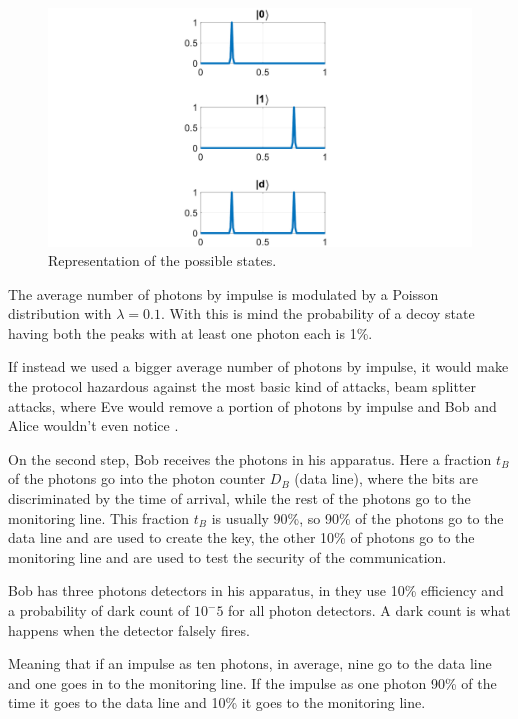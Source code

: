 \begin{refsection}
\begin{figure}[hbt!]
\centering
\includegraphics[width=1\linewidth]{./sdf/tq_76558_cow_protocol/slides/figures/S1A.pdf}
\caption{Representation of the possible states.}
\label{fig:sta}
\end{figure}

The average number of photons by impulse is modulated by a Poisson distribution with $\lambda=0.1$. With this is mind the probability of a decoy state having both the peaks with at least one photon each is 1\%.

If instead we used a bigger average number of photons by impulse, it would make the protocol hazardous against the most basic kind of attacks, beam splitter attacks, where Eve would remove a portion of photons by impulse and Bob and Alice wouldn't even notice \cite{kronberg2017analysis}.

On the second step, Bob receives the photons in his apparatus. Here a fraction $t_B$ of the photons go into the photon counter $D_B$ (data line), where the bits are discriminated by the time of arrival, while the rest of the photons go to the monitoring line. This fraction $t_B$ is usually 90\%, so 90\% of the photons go to the data line and are used to create the key, the other 10\% of photons go to the monitoring line and are used to test the security of the communication.

Bob has three photons detectors in his apparatus, in \cite{gisin2004towards} they use 10\% efficiency and a probability of dark count of $10^-5$ for all photon detectors. A dark count is what happens when the detector falsely fires.

Meaning that if an impulse as ten photons, in average, nine go to the data line and one goes in to the monitoring line. If the impulse as one photon 90\% of the time it goes to the data line and 10\% it goes to the monitoring line.


\end{refsection}
